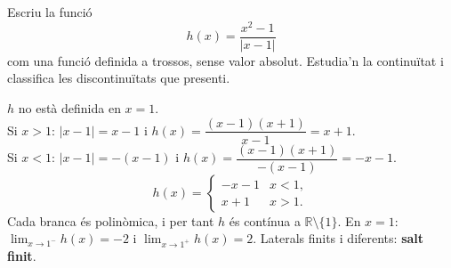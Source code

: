 \begin{apartats}
\begin{nomesllarg}
Escriu la funció
\[
h(x)=\frac{x^2-1}{|x-1|}
\]
com una funció definida a trossos, sense valor absolut. Estudia'n la continuïtat i
classifica les discontinuïtats que presenti.

\begin{solucio}
$h$ no està definida en $x=1$.\\
Si $x>1$: $|x-1|=x-1$ i $h(x)=\dfrac{(x-1)(x+1)}{x-1}=x+1$.\\
Si $x<1$: $|x-1|=-(x-1)$ i $h(x)=\dfrac{(x-1)(x+1)}{-(x-1)}=-x-1$.
\[
h(x)=\begin{cases} -x-1 & \si{x<1},\\ x+1 & \si{x>1}.\end{cases}
\]
Cada branca és polinòmica, i per tant $h$ és contínua a $\mathbb{R}\setminus\{1\}$.
En $x=1$: $\lim_{x\to1^-}h(x)=-2$ i $\lim_{x\to1^+}h(x)=2$. Laterals finits i
diferents: \textbf{salt finit}.
\end{solucio}
\end{nomesllarg}

\end{apartats}
